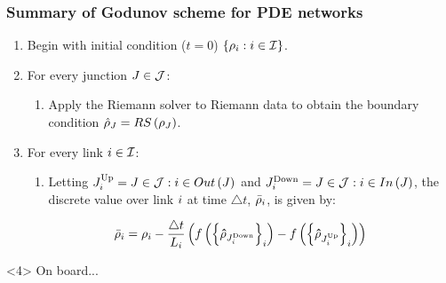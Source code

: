 \begin{frame}
\frametitle{Summary of Godunov scheme for PDE networks}


\begin{enumerate}
\item<1-> Begin with initial condition ($t=0$) $\left\{ \rho_{i}:i\in\mathcal{I}\right\} $.
\item<2-> For every junction $J\in\mathcal{J}$:
\begin{enumerate}
\item<2-> Apply the Riemann solver to Riemann data to obtain the boundary condition
$\hat{\mathbf{\rho}}_{J}=RS\left(\mathbf{\rho}_{J}\right)$.
\end{enumerate}
\item<3-> For every link $i\in\mathcal{I}$:

\begin{enumerate}
\item<3-> Letting $J_{i}^{\text{Up}}=J\in\mathcal{J}:i\in Out\left(J\right)$
and $J_{i}^{\text{Down}}=J\in\mathcal{J}:i\in In\left(J\right)$,
the discrete value over link $i$ at time $\triangle t$, $\bar{\rho}_{i}$,
is given by:
\end{enumerate}

\[
\bar{\rho}_{i}=\rho_{i}-\frac{\triangle t}{L_{i}}\left(f\left(\left\{ \mathbf{\hat{\rho}}_{J_{i}^{\text{Down}}}\right\} _{i}\right)-f\left(\left\{ \mathbf{\hat{\rho}}_{J_{i}^{\text{Up}}}\right\} _{i}\right)\right)
\]

\end{enumerate}

\begin{example}<4>
On board...
\end{example}

\end{frame}



